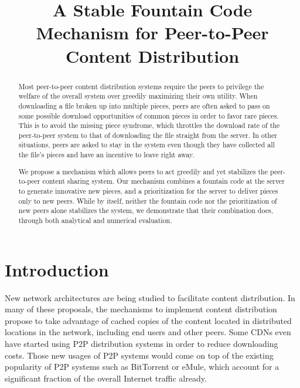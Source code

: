 \documentclass[11pt,conference]{IEEEtran}
\begin{document}
\title{A Stable Fountain Code Mechanism for Peer-to-Peer Content Distribution}


\author{
}

\maketitle


\begin{abstract}
Most peer-to-peer content distribution systems require the peers to privilege the welfare of the overall system over greedily maximizing their own utility. When downloading a file broken up into multiple pieces, peers are often asked to pass on some possible download opportunities of common pieces in order to favor rare pieces. This is to avoid the missing piece syndrome, which throttles the download rate of the peer-to-peer system to that of downloading the file straight from the server. In other situations, peers are asked to stay in the system even though they have collected all the file's pieces and have an incentive to leave right away.

We propose a mechanism which allows peers to act greedily and yet stabilizes the peer-to-peer content sharing system. Our mechanism combines a fountain code at the server to generate innovative new pieces, and a prioritization for the server to deliver pieces only to new peers. While by itself, neither the fountain code nor the prioritization of new peers alone stabilizes the system, we demonstrate that their combination does, through both analytical and numerical evaluation.
\end{abstract}



\section{Introduction}


New network architectures are being studied  to facilitate content distribution\cite{Jacobson2009Networking,Zhang2010Named,Pursuit,Ahlgren2012Survey,azimdoost2012throughput,chanda2013content,chanda2013contentflow,su2013benefit}. In many of these proposals, the mechanisms to implement content distribution propose to take advantage of cached copies of the content located in distributed locations in the network, including end users and other peers. Some CDNs\cite{Akamai2007} even have started using P2P distribution systems in order to reduce downloading costs. Those new usages of P2P systems would come on top of the existing popularity of P2P systems such as BitTorrent\cite{BitTorrent} or eMule\cite{eMule}, which account for a significant fraction of the overall Internet traffic already.
\end{document}
